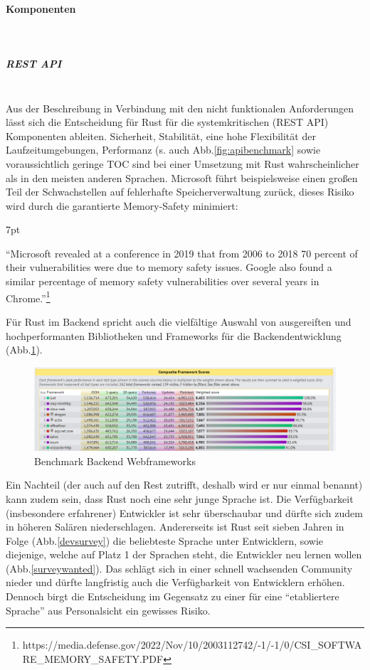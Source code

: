 \documentclass[notitlepage, hidelinks]{article}
\newenvironment{formal}{%
  \def\FrameCommand{%
    \hspace{1pt}%
    {\color{black}\vrule width 2pt}%
    {\color{formalshade}\vrule width 4pt}%
    \colorbox{formalshade}%
  }%
  \MakeFramed{\advance\hsize-\width\FrameRestore}%
  \noindent\hspace{-4.55pt}%
  \begin{adjustwidth}{}{7pt}%
  \vspace{2pt}\vspace{2pt}%
}
{%
  \vspace{2pt}\end{adjustwidth}\endMakeFramed%
}
\begin{document}
\paragraph{Komponenten} \mbox{} \\
\subparagraph{REST API} \mbox{} \\
Aus der Beschreibung in Verbindung mit den nicht funktionalen Anforderungen lässt sich die Entscheidung für Rust für die systemkritischen (REST API) Komponenten ableiten. Sicherheit, Stabilität, eine hohe Flexibilität der Laufzeitumgebungen, Performanz (s. auch Abb.\ref{fig:apibenchmark} sowie voraussichtlich geringe TOC sind bei einer Umsetzung mit Rust wahrscheinlicher als in den meisten anderen Sprachen. Microsoft führt beispielsweise einen großen Teil der Schwachstellen auf fehlerhafte Speicherverwaltung zurück, dieses Risiko wird durch die garantierte Memory-Safety minimiert:
\begin{formal}
``Microsoft revealed at a conference in 2019 that from 2006 to 2018 70 percent of their vulnerabilities were due to memory safety issues. Google also found a similar percentage of memory safety vulnerabilities over several years in Chrome.''\footnote{https://media.defense.gov/2022/Nov/10/2003112742/-1/-1/0/CSI\_SOFTWARE\_MEMORY\_SAFETY.PDF}
\end{formal}

Für Rust im Backend spricht auch die vielfältige Auswahl von ausgereiften und hochperformanten Bibliotheken und Frameworks für die Backendentwicklung (Abb.\ref{apibenchmark}). 

\begin{figure}[H]
\centering
  \includegraphics[width=\textwidth]{images/score3.png}
  \caption{Benchmark Backend Webframeworks}
  \label{apibenchmark}
\end{figure}

Ein Nachteil (der auch auf den Rest zutrifft, deshalb wird er nur einmal benannt) kann zudem sein, dass Rust noch eine sehr junge Sprache ist. Die Verfügbarkeit (insbesondere erfahrener) Entwickler ist sehr überschaubar und dürfte sich zudem in höheren Salären niederschlagen. Andererseits ist Rust seit sieben Jahren in Folge (Abb.\ref{devsurvey}) die beliebteste Sprache unter Entwicklern, sowie diejenige, welche   auf Platz 1 der Sprachen steht, die Entwickler neu lernen wollen (Abb.\ref{surveywanted}). Das schlägt sich in einer schnell wachsenden Community nieder und dürfte langfristig auch die Verfügbarkeit von Entwicklern erhöhen. Dennoch birgt die Entscheidung im Gegensatz zu einer für eine ``etabliertere Sprache'' aus Personalsicht ein gewisses Risiko.
\end{document}
